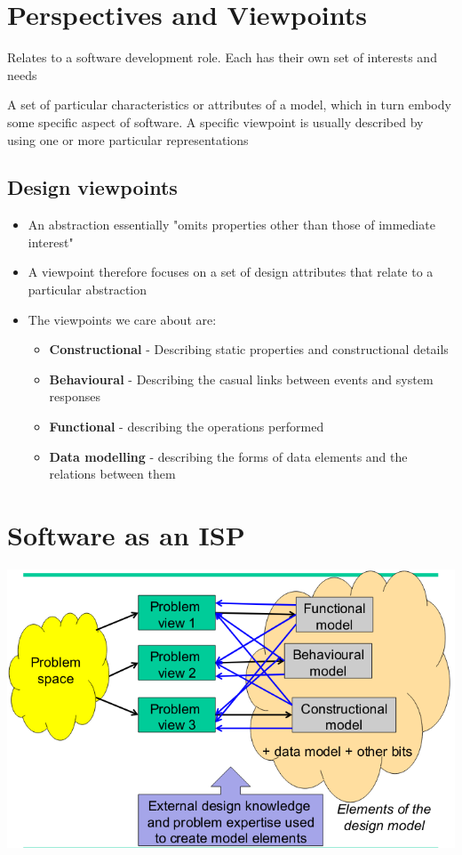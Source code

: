 \documentclass{article}[18pt]
\begin{document}
\section{Perspectives and Viewpoints}
\begin{defin}[Perspective]
	Relates to a software development role. Each has their own set of interests and needs
\end{defin}

\begin{defin}[Viewpoint]
	A set of particular characteristics or attributes of a model, which in turn embody some specific aspect of software. A specific viewpoint is usually described by using one or more particular representations 
\end{defin}
\subsection{Design viewpoints}
\begin{itemize}
	\item An abstraction essentially "omits properties other than those of immediate interest"
	\item A viewpoint therefore focuses on a set of design attributes that relate to a particular abstraction
	\item The viewpoints we care about are:
	\begin{itemize}
		\item \textbf{Constructional} - Describing static properties and constructional details
		\item \textbf{Behavioural} - Describing the casual links between events and system responses
		\item \textbf{Functional} - describing the operations performed
		\item \textbf{Data modelling} - describing the forms of data elements and the relations between them
	\end{itemize}
\end{itemize}
\section{Software as an ISP}
\begin{center}
	\includegraphics[scale=0.7]{ISP}
\end{center}
\end{document}
